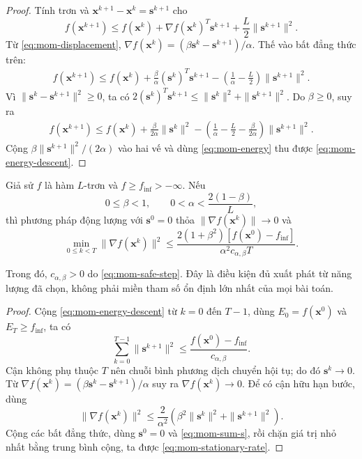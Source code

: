 \begin{proof}
Tính trơn và $\mathbf{x}^{k+1}-\mathbf{x}^{k}=\mathbf{s}^{k+1}$ cho
\[
 f(\mathbf{x}^{k+1})\leq f(\mathbf{x}^{k})+
 \nabla f(\mathbf{x}^{k})^T\mathbf{s}^{k+1}
 +\frac{L}{2}\|\mathbf{s}^{k+1}\|^2.
\]
Từ \eqref{eq:mom-displacement},
$\nabla f(\mathbf{x}^{k})=(\beta\mathbf{s}^{k}-\mathbf{s}^{k+1})/\alpha$.
Thế vào bất đẳng thức trên:
\begin{align*}
 f(\mathbf{x}^{k+1})
 \leq f(\mathbf{x}^{k})+
 \frac{\beta}{\alpha}(\mathbf{s}^{k})^T\mathbf{s}^{k+1}
 -\left(\frac{1}{\alpha}-\frac{L}{2}\right)
                  \|\mathbf{s}^{k+1}\|^2.
\end{align*}
Vì $\|\mathbf{s}^{k}-\mathbf{s}^{k+1}\|^2\geq0$, ta có
$2(\mathbf{s}^{k})^T\mathbf{s}^{k+1}
\leq\|\mathbf{s}^{k}\|^2+\|\mathbf{s}^{k+1}\|^2$.
Do $\beta\geq0$, suy ra
\begin{align*}
 f(\mathbf{x}^{k+1})
 \leq f(\mathbf{x}^{k})+\frac{\beta}{2\alpha}\|\mathbf{s}^{k}\|^2
 -\left(\frac{1}{\alpha}-\frac{L}{2}-\frac{\beta}{2\alpha}\right)
                              \|\mathbf{s}^{k+1}\|^2.
\end{align*}
Cộng $\beta\|\mathbf{s}^{k+1}\|^2/(2\alpha)$ vào hai vế và dùng
\eqref{eq:mom-energy} thu được \eqref{eq:mom-energy-descent}.
\end{proof}

\begin{theorem}\label{thm:mom-stationary}
Giả sử $f$ là hàm $L$-trơn và $f\geq f_{\inf}>-\infty$.
Nếu
\begin{equation}
 0\leq\beta<1,\qquad 0<\alpha<\frac{2(1-\beta)}{L},
 \label{eq:mom-safe-step}
\end{equation}
thì phương pháp động lượng với $\mathbf{s}^{0}=0$ thỏa
$\|\nabla f(\mathbf{x}^{k})\|\to0$ và
\begin{equation}
 \min_{0\leq k<T}\|\nabla f(\mathbf{x}^{k})\|^2
 \leq\frac{2(1+\beta^2)[f(\mathbf{x}^{0})-f_{\inf}]}
             {\alpha^2 c_{\alpha,\beta}T}.
 \label{eq:mom-stationary-rate}
\end{equation}
\end{theorem}
Trong đó, $c_{\alpha,\beta}>0$ do \eqref{eq:mom-safe-step}.
Đây là điều kiện đủ xuất phát từ năng lượng đã chọn, không phải miền
tham số ổn định lớn nhất của mọi bài toán.

\begin{proof}
Cộng \eqref{eq:mom-energy-descent} từ $k=0$ đến $T-1$, dùng
$E_0=f(\mathbf{x}^{0})$ và $E_T\geq f_{\inf}$, ta có
\begin{equation}
 \sum_{k=0}^{T-1}\|\mathbf{s}^{k+1}\|^2
 \leq\frac{f(\mathbf{x}^{0})-f_{\inf}}{c_{\alpha,\beta}}.
 \label{eq:mom-sum-s}
\end{equation}
Cận không phụ thuộc $T$ nên chuỗi bình phương dịch chuyển hội tụ;
do đó $\mathbf{s}^{k}\to0$. Từ
$\nabla f(\mathbf{x}^{k})=(\beta\mathbf{s}^{k}-\mathbf{s}^{k+1})/\alpha$
suy ra $\nabla f(\mathbf{x}^{k})\to0$.
Để có cận hữu hạn bước, dùng
\[
 \|\nabla f(\mathbf{x}^{k})\|^2
 \leq\frac{2}{\alpha^2}
      \left(\beta^2\|\mathbf{s}^{k}\|^2+\|\mathbf{s}^{k+1}\|^2\right).
\]
Cộng các bất đẳng thức, dùng $\mathbf{s}^{0}=0$ và
\eqref{eq:mom-sum-s}, rồi chặn giá trị nhỏ nhất bằng trung bình cộng,
ta được \eqref{eq:mom-stationary-rate}.
\end{proof}

